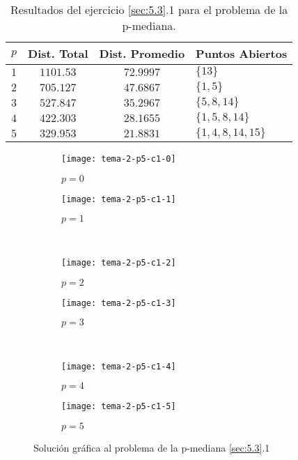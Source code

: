 \documentclass[spanish]{article}
\begin{document}
			\begin{table}[h]
				\begin{center}
					\begin{tabular}{|c || c || c || l | }
						\hline
						$p$		& Dist. Total 	& Dist. Promedio	& Puntos Abiertos	 \\ \hline \hline
						$1$ 	& $1101.53$ 		& $72.9997$				& $\{13\}$ \\ \hline
						$2$ 	& $705.127$ 		& $47.6867$				& $\{1,5\}$ \\ \hline
						$3$ 	& $527.847$ 		& $35.2967$				& $\{5,8,14\}$ \\ \hline
						$4$ 	& $422.303$ 		& $28.1655$				& $\{1,5,8,14\}$ \\ \hline
						$5$ 	& $329.953$ 		& $21.8831$				& $\{1,4,8,14,15\}$ \\
						\hline
					\end{tabular}
				\end{center}
				\caption{Resultados del ejercicio \ref{sec:5.3}.1 para el problema de la p-mediana.}
				\label{table:sol-5.3.1}
			\end{table}


			\begin{figure}[h]
			\centering
			\begin{subfigure}{.5\textwidth}
			  \centering
			  \texttt{[image: tema-2-p5-c1-0]}
			  \caption{$p=0$}
			  \label{fig:sub1}
			\end{subfigure}%
			\begin{subfigure}{.5\textwidth}
				\centering
				\texttt{[image: tema-2-p5-c1-1]}
				\caption{$p=1$}
				\label{fig:sub1}
			\end{subfigure} \\
			\begin{subfigure}{.5\textwidth}
				\centering
				\texttt{[image: tema-2-p5-c1-2]}
				\caption{$p=2$}
				\label{fig:sub1}
			\end{subfigure}%
			\begin{subfigure}{.5\textwidth}
				\centering
				\texttt{[image: tema-2-p5-c1-3]}
				\caption{$p=3$}
				\label{fig:sub1}
			\end{subfigure} \\
			\begin{subfigure}{.5\textwidth}
				\centering
				\texttt{[image: tema-2-p5-c1-4]}
				\caption{$p=4$}
				\label{fig:sub1}
			\end{subfigure}%
			\begin{subfigure}{.5\textwidth}
				\centering
				\texttt{[image: tema-2-p5-c1-5]}
				\caption{$p=5$}
				\label{fig:sub1}
			\end{subfigure}%
			\caption{Solución gráfica al problema de la p-mediana \ref{sec:5.3}.1}
			\label{fig:sol-5.3.1}
			\end{figure}
\end{document}
